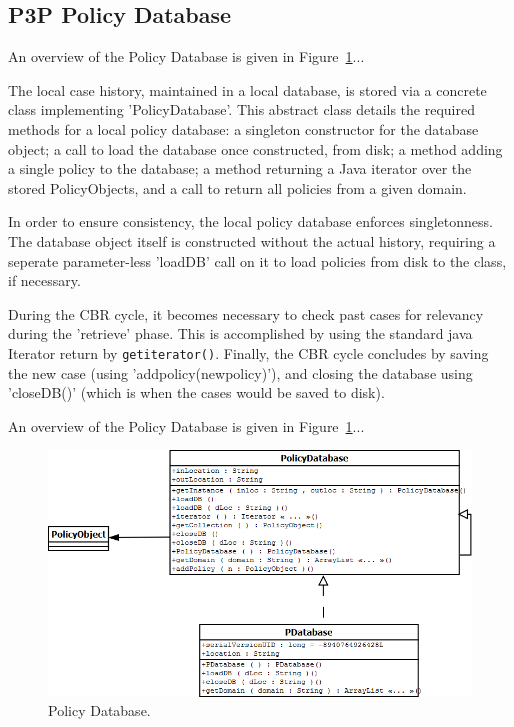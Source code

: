 \subsection{P3P Policy Database}

An overview of the Policy Database is given in Figure~\ref{pd_fig}...

The local case history, maintained in a local database, is stored via a concrete class implementing 'PolicyDatabase'. This abstract class details the required methods for a local policy database: a singleton constructor for the database object; a call to load the database once constructed, from disk; a method adding a single policy to the database; a method returning a Java iterator over the stored PolicyObjects, and a call to return all policies from a given domain.

In order to ensure consistency, the local policy database enforces singletonness. The database object itself is constructed without the actual history, requiring a seperate parameter-less 'loadDB' call on it to load policies from disk to the class, if necessary.

During the CBR cycle, it becomes necessary to check past cases for relevancy during the 'retrieve' phase. This is accomplished by using the standard java Iterator return by \texttt{getiterator()}.
Finally, the CBR cycle concludes by saving the new case (using 'addpolicy(newpolicy)'), and closing the database using 'closeDB()' (which is when the cases would be saved to disk).

An overview of the Policy Database is given in Figure~\ref{pd_fig}...



\begin{figure}[htbp]
\begin{center}
\includegraphics[width = \textwidth]{DesignReport/uml/pd.png}
\caption{Policy Database.}
\label{pd_fig}
\end{center}
\end{figure}



